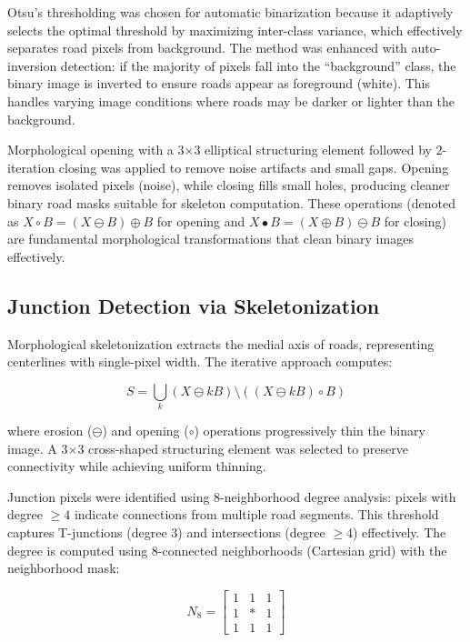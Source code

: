 \documentclass[conference]{IEEEtran}
\begin{document}
Otsu's thresholding was chosen for automatic binarization because it adaptively selects the optimal threshold by maximizing inter-class variance, which effectively separates road pixels from background. The method was enhanced with auto-inversion detection: if the majority of pixels fall into the ``background'' class, the binary image is inverted to ensure roads appear as foreground (white). This handles varying image conditions where roads may be darker or lighter than the background.

Morphological opening with a 3$\times$3 elliptical structuring element followed by 2-iteration closing was applied to remove noise artifacts and small gaps. Opening removes isolated pixels (noise), while closing fills small holes, producing cleaner binary road masks suitable for skeleton computation. These operations (denoted as $X \circ B = (X \ominus B) \oplus B$ for opening and $X \bullet B = (X \oplus B) \ominus B$ for closing) are fundamental morphological transformations that clean binary images effectively.

\subsection{Junction Detection via Skeletonization}

Morphological skeletonization extracts the medial axis of roads, representing centerlines with single-pixel width. The iterative approach computes:

\begin{equation}
S = \bigcup_k (X \ominus kB) \setminus ((X \ominus kB) \circ B)
\end{equation}

where erosion ($\ominus$) and opening ($\circ$) operations progressively thin the binary image. A 3$\times$3 cross-shaped structuring element was selected to preserve connectivity while achieving uniform thinning.

Junction pixels were identified using 8-neighborhood degree analysis: pixels with degree $\geq 4$ indicate connections from multiple road segments. This threshold captures T-junctions (degree 3) and intersections (degree $\geq 4$) effectively. The degree is computed using 8-connected neighborhoods (Cartesian grid) with the neighborhood mask:

\begin{equation}
N_8 = \begin{bmatrix}
1 & 1 & 1 \\
1 & * & 1 \\
1 & 1 & 1
\end{bmatrix}
\end{equation}
\end{document}
